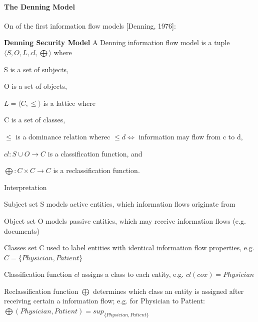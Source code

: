 \documentclass[a4paper]{article}
\renewcommand{\note}[2]{\begin{noteBox} \textbf{#1} #2 \end{noteBox}}
\begin{document}
\begin{multicols}{3}
    \paragraph{The Denning Model}
    On of the first information flow models [Denning, 1976]:

    \note{Denning Security Model}{A Denning information flow model is a tuple $⟨S,O,L,cl,\bigoplus⟩$ where
        \begin{itemize*}
            \item S is a set of subjects,
            \item O is a set of objects,
            \item $L=⟨C,\leq⟩$ is a lattice where
            \begin{itemize*}
                \item C is a set of classes,
                \item $\leq$ is a dominance relation wherec $\leq d \Leftrightarrow$ information may flow from c to d,
            \end{itemize*}
            \item $cl:S\cup O\rightarrow C$ is a classification function, and
            \item $\bigoplus:C\times C\rightarrow C$ is a reclassification function.
        \end{itemize*}
    }

    Interpretation
    \begin{itemize*}
        \item Subject set S models active entities, which information flows originate from
        \item Object set O models passive entities, which may receive information flows (e.g. documents)
        \item Classes set C used to label entities with identical information flow properties, e.g. $C=\{Physician,Patient\}$
        \item Classification function $cl$ assigns a class to each entity, e.g. $cl(cox)=Physician$
        \item Reclassification function $\bigoplus$ determines which class an entity is assigned after receiving certain a information flow; e.g. for Physician to Patient: $\bigoplus (Physician,Patient)=sup_{\{Physician,Patient\}}$
    \end{itemize*}


\end{multicols}
\end{document}
